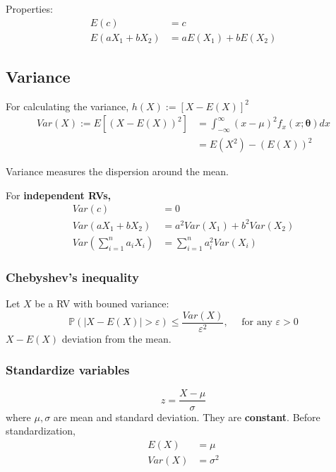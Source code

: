 \documentclass[12pt]{article}
\begin{document}
Properties:
\begin{align*}
E(c)&= c\\
E(aX_1 + bX_2)&= aE(X_1) + bE(X_2)
\end{align*}




\subsection{Variance}
For calculating the variance, $ h(X):= [X - E(X)]^{2} $
\begin{align*}
	Var(X):=E[(X - E(X))^{2}] &= \int_{ - \infty }^{\infty }(x - \mu)^{2}f_{x}(x;\bm{\theta})dx \\
	&= E(X^{2}) - (E(X))^{2}
\end{align*}

Variance measures the dispersion around the mean.

For {\textbf {independent RVs,}}
\begin{align*}
Var(c) &= 0\\
Var(aX_1 + bX_2)&= a^{2}Var(X_1) + b^{2}Var(X_2)\\
Var \left( \sum\limits_{i = 1} ^n a_{i}X_{i}	 \right) &= \sum\limits_{i = 1} ^n a_{i}^{2}Var(X_{i})	
\end{align*}


\subsubsection{Chebyshev's inequality}
Let $ X $ be a RV with bouned variance:
\begin{equation*}
\mathbb{P}\left( \left\lvert X - E(X) \right\rvert > \varepsilon  \right) \le 
\frac{Var(X)}{\varepsilon^{2}}, \quad \text{ for any } \varepsilon > 0
\end{equation*}
$ X - E(X) $ deviation from the mean.


\subsubsection{Standardize variables}

\begin{equation*}
z = \frac{X - \mu}{\sigma}
\end{equation*}
where $ \mu , \sigma $ are mean and standard deviation. They are {\textbf {constant}}.
Before standardization, 
\begin{align*}
E(X) &= \mu\\
Var(X) &= \sigma^{2}
\end{align*}
\end{document}
